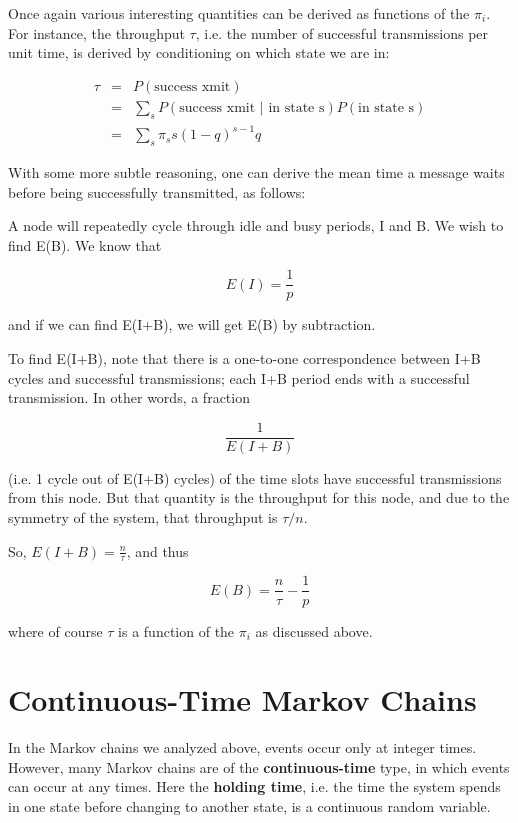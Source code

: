 \documentclass[11pt]{article}
\begin{document}
Once again various interesting quantities can be derived as functions of the
$\pi_{i}$. For instance, the throughput $\tau$, i.e. the number
of successful transmissions per unit time, is derived by conditioning on
which state we are in:

\begin{eqnarray}  
\tau  & = & P(\textrm{success xmit}) \nonumber \\
 & = & \sum_{s}P(\textrm{success xmit }|\textrm{ in state s})P(\textrm{in state s}) \nonumber \\
 & = & \sum_{s}\pi_{s} s {(1-q)}^{s-1}q
\end{eqnarray}

With some more subtle reasoning, one can derive the mean time a message waits
before being successfully transmitted, as follows:

A node will repeatedly cycle through idle and busy periods, I and B. We wish
to find E(B). We know that

\begin{equation}
E(I)=\frac{1}{p}
\end{equation}

and if we can find E(I+B), we will get E(B) by subtraction.

To find E(I+B), note that there is a one-to-one correspondence between
I+B cycles and successful transmissions; each I+B period ends with a
successful transmission.  In other words, a fraction

\begin{equation}
\frac{1}{E(I+B)}  
\end{equation}

(i.e. 1 cycle out of E(I+B) cycles) of the time slots have successful
transmissions from this node. But that quantity is the throughput for
this node, and due to the symmetry of the system, that throughput is
$\tau/n$.

So, $E(I+B)=\frac{n}{\tau}$, and thus

\begin{equation}
E(B)=\frac{n}{\tau }-\frac{1}{p}
\end{equation}  

where of course $\tau$ is a function of the $\pi_{i}$ as discussed
above.

\section{Continuous-Time Markov Chains}

In the Markov chains we analyzed above, events occur only at integer times.
However, many Markov chains are of the \textbf{continuous-time} type, in which
events can occur at any times. Here the \textbf{holding time}, i.e. the time
the system spends in one state before changing to another state, is a continuous
random variable.
\end{document}
